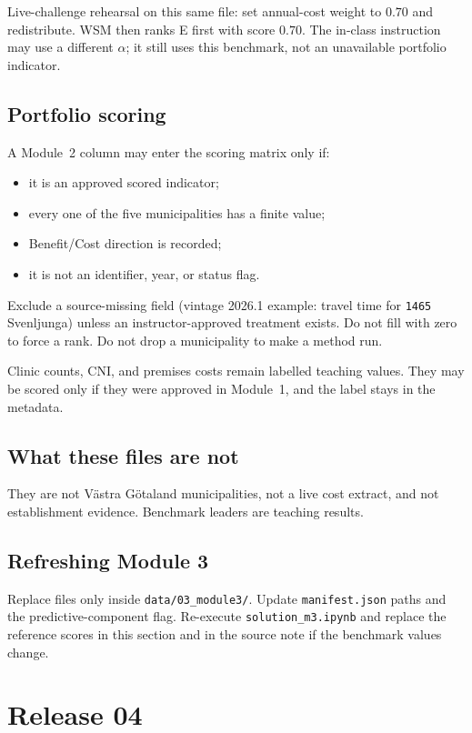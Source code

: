 \documentclass[11pt,a4paper]{article}
\begin{document}
Live-challenge rehearsal on this same file: set annual-cost weight
to $0.70$ and redistribute. WSM then ranks E first with score $0.70$.
The in-class instruction may use a different $\alpha$; it still uses
this benchmark, not an unavailable portfolio indicator.

\subsection*{Portfolio scoring}

A Module~2 column may enter the scoring matrix only if:
\begin{itemize}
    \item it is an approved scored indicator;
    \item every one of the five municipalities has a finite value;
    \item Benefit/Cost direction is recorded;
    \item it is not an identifier, year, or status flag.
\end{itemize}

Exclude a source-missing field (vintage 2026.1 example: travel time
for \texttt{1465} Svenljunga) unless an instructor-approved treatment
exists. Do not fill with zero to force a rank. Do not drop a
municipality to make a method run.

Clinic counts, CNI, and premises costs remain labelled teaching
values. They may be scored only if they were approved in Module~1,
and the label stays in the metadata.

\subsection*{What these files are not}

They are not V\"astra G\"otaland municipalities, not a live cost
extract, and not establishment evidence. Benchmark leaders are
teaching results.

\subsection*{Refreshing Module 3}

Replace files only inside \texttt{data/03\_module3/}. Update
\texttt{manifest.json} paths and the predictive-component flag.
Re-execute \texttt{solution\_m3.ipynb} and replace the reference
scores in this section and in the source note if the benchmark
values change.

\section{Release 04}
\end{document}
